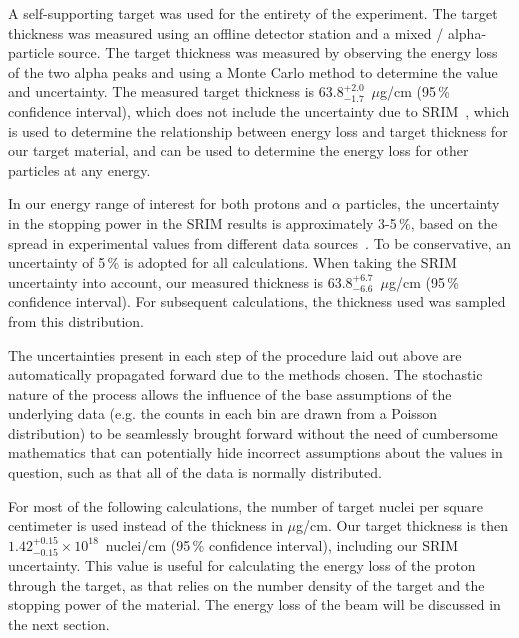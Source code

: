 A self-supporting  target was used for the entirety of the
experiment. The target thickness was measured using an offline detector
station and a mixed / alpha-particle source.
The target thickness was measured by observing the energy loss of the
two alpha peaks and using a Monte Carlo method to determine the value
and uncertainty. The measured target thickness is
$63.8^{+2.0}_{-1.7}$~$\mu$g/cm\squared{} (95\,\% confidence interval),
which does not include the uncertainty due to SRIM~\cite{SRIM}, which
is used to determine the relationship between energy loss and target
thickness for our target material, and can be used to determine the
energy loss for other particles at any energy.

In our energy range of interest for both protons and $\alpha$ particles,
the uncertainty in the stopping power in the SRIM results is
approximately 3-5\,\%, based on the spread in experimental values from
different data sources~\cite{Paul2001}.
To be conservative, an uncertainty of 5\,\% is
adopted for all calculations. When taking the SRIM uncertainty into
account, our measured thickness is
$63.8^{+6.7}_{-6.6}$~$\mu$g/cm\squared{} (95\,\% confidence interval).
For subsequent calculations, the thickness used was sampled from this
distribution.


The uncertainties present in each step of the procedure laid out above
are automatically propagated forward due to the methods chosen. The
stochastic nature of the process allows the influence of the base
assumptions of the underlying data (e.g. the counts in each bin are
drawn from a Poisson distribution) to be seamlessly brought forward
without the need of cumbersome mathematics that can potentially hide
incorrect assumptions about the values in question, such as that all of
the data is normally distributed.

For most of the following calculations, the number of target nuclei per
square centimeter is used instead of the thickness in
$\mu$g/cm\squared{}. Our target thickness is then $1.42^{+0.15}_{-0.15}
\times 10^{18}$~nuclei/cm\squared{} (95\,\% confidence interval),
including our SRIM uncertainty. This value is useful for calculating the
energy loss of the proton through the target, as that relies on the
number density of the target and the stopping power of the material. The
energy loss of the beam will be discussed in the next section.


